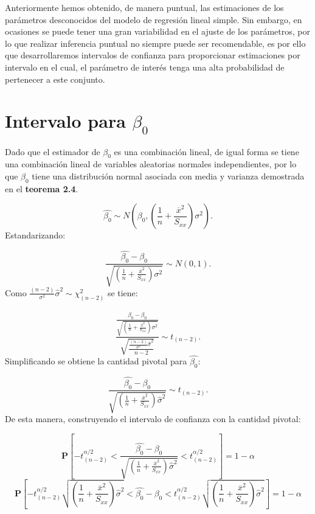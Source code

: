 \documentclass[
  a4paper,
  oneside,
  openany]{book}
\begin{document}
Anteriormente hemos obtenido, de manera puntual, las estimaciones de los parámetros desconocidos del modelo de regresión lineal simple. Sin embargo, en ocasiones se puede tener una gran variabilidad en el ajuste de los parámetros, por lo que realizar inferencia puntual no siempre puede ser recomendable, es por ello que desarrollaremos intervalos de confianza para proporcionar estimaciones por intervalo en el cual, el parámetro de interés tenga una alta probabilidad de pertenecer a este conjunto.

\hypertarget{intervalo-para-beta_0}{%
\section{\texorpdfstring{Intervalo para \(\beta_{0}\)}{Intervalo para \textbackslash beta\_\{0\}}}\label{intervalo-para-beta_0}}

Dado que el estimador de \(\beta_{0}\) es una combinación lineal, de igual forma se tiene una combinación lineal de variables aleatorias normales independientes, por lo que \(\beta_{0}\) tiene una distribución normal asociada con media y varianza demostrada en el \textbf{teorema 2.4}.

\[\hat{\beta_{0}} \sim N \left( \beta_{0},\left(\frac{1}{n}+\frac{\overline{x}^2}{S_{xx}}\right)\sigma^2\right).\]
Estandarizando:

\[\frac{\hat{\beta_{0}}-\beta_{0}}{\sqrt{\left(\frac{1}{n}+\frac{\overline{x}^2}{S_{xx}}\right)\sigma^2}}\sim N (0,1).\]
Como \(\frac{(n-2)}{\sigma^2}\hat{\sigma}^2\sim\chi^2_{(n-2)}\) se tiene:

\[\frac{\frac{\hat{\beta_{0}}-\beta_{0}}{\sqrt{\left(\frac{1}{n}+\frac{\overline{x}^2}{S_{xx}}\right)\sigma^2}}}{\sqrt{\frac{\frac{(n-2)}{\sigma^2}\hat{\sigma}^2}{n-2}}}\sim t_{(n-2)}.\]
Simplificando se obtiene la cantidad pivotal para \(\hat{\beta_{0}}:\)

\[\frac{\hat{\beta_{0}}-\beta_{0}}{\sqrt{\left(\frac{1}{n}+\frac{\overline{x}^2}{S_{xx}}\right)\hat{\sigma}^2}} \sim t_{(n-2)}.\]
De esta manera, construyendo el intervalo de confianza con la cantidad pivotal:

\[\mathbf{P}\left[-t^{\alpha/2}_{(n-2)}<\frac{\hat{\beta_{0}}-\beta_{0}}{\sqrt{\left(\frac{1}{n}+\frac{\overline{x}^2}{S_{xx}}\right)\hat{\sigma}^2}}< t^{\alpha/2}_{(n-2)}\right]=1-\alpha\]
\[\mathbf{P}\left[-t^{\alpha/2}_{(n-2)}\sqrt{\left(\frac{1}{n}+\frac{\overline{x}^2}{S_{xx}}\right)\hat{\sigma}^2}<\hat{\beta_{0}}-\beta_{0}< t^{\alpha/2}_{(n-2)}\sqrt{\left(\frac{1}{n}+\frac{\overline{x}^2}{S_{xx}}\right)\hat{\sigma}^2}\right]=1-\alpha\]
\end{document}
